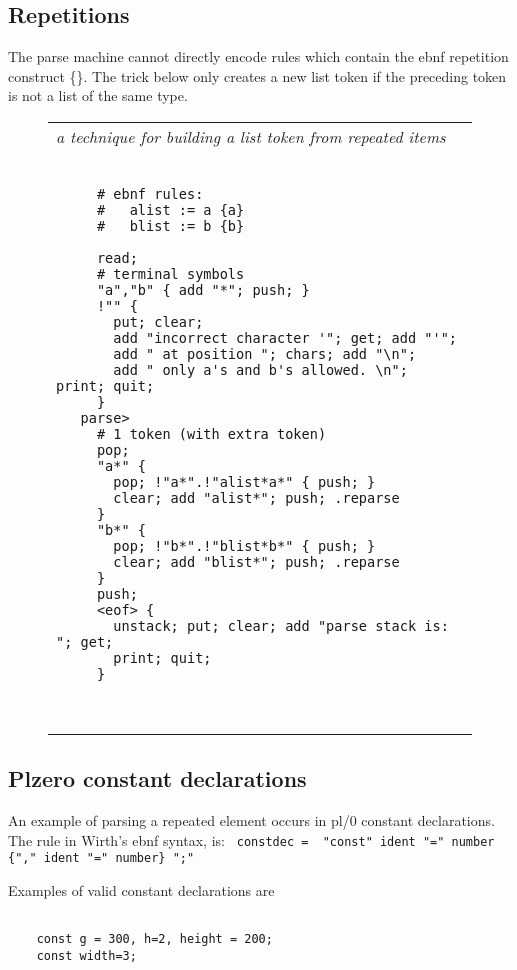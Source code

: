 \documentclass[a4paper,12pt]{article}
\begin{document}
\subsection{Repetitions}
 
  The parse machine cannot directly encode rules which contain the ebnf
  repetition construct \{\}. The trick below only creates a new list token if
  the preceding token is not a list of the same type.
 \begin{figure}
 \begin{tabular}{ l }
 \emph{ a technique for building a list token from repeated items  } \\ 
 \begin{lstlisting}[breaklines] 

     # ebnf rules:
     #   alist := a {a}
     #   blist := b {b}

     read;
     # terminal symbols
     "a","b" { add "*"; push; }
     !"" { 
       put; clear; 
       add "incorrect character '"; get; add "'";
       add " at position "; chars; add "\n"; 
       add " only a's and b's allowed. \n"; print; quit;
     }
   parse>
     # 1 token (with extra token)
     pop;
     "a*" { 
       pop; !"a*".!"alist*a*" { push; } 
       clear; add "alist*"; push; .reparse
     }
     "b*" { 
       pop; !"b*".!"blist*b*" { push; } 
       clear; add "blist*"; push; .reparse
     }
     push;
     <eof> {
       unstack; put; clear; add "parse stack is: "; get;
       print; quit; 
     }

  
 \end{lstlisting} 
 \end{tabular} 

 \end{figure}

\subsection{Plzero constant declarations}

  An example of parsing a repeated element occurs in pl/0 constant
  declarations. The rule in Wirth's ebnf syntax, is: 
 \verb| constdec =  "const" ident "=" number {"," ident "=" number} ";" |


  Examples of valid constant declarations are 
 \begin{lstlisting}[breaklines] 

    const g = 300, h=2, height = 200;
    const width=3;
  
 \end{lstlisting} 
\end{document}
